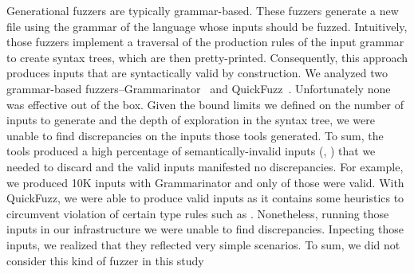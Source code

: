 \documentclass[10pt,conference,anonymous]{IEEEtran}
\begin{document}
Generational fuzzers are typically grammar-based. These fuzzers
generate a new file using the grammar of the language whose inputs
should be fuzzed. Intuitively, those fuzzers implement a traversal of
the production rules of the input grammar to create syntax trees,
which are then pretty-printed. Consequently, this approach produces
inputs that are syntactically valid by construction.  We analyzed two
grammar-based fuzzers--Grammarinator~\cite{grammarinator} and
QuickFuzz~\cite{quickfuzz,grieco2016quickfuzz}.  Unfortunately none
was effective out of the box. Given the bound limits we defined on the
number of inputs to generate and the depth of exploration in the
syntax tree, we were unable to find discrepancies on the inputs those
tools generated. To sum, the tools produced a high percentage of
semantically-invalid inputs (\eg{}, ) that we needed to
discard and the valid inputs manifested no discrepancies. For example,
we produced 10K inputs with Grammarinator and only  of those
were valid. With QuickFuzz, we were able to produce 
valid inputs as it contains some heuristics to circumvent violation of
certain type rules such as . Nonetheless, running those inputs in our infrastructure
we were unable to find discrepancies. Inpecting those inputs, we
realized that they reflected very simple scenarios.  To sum, we did not consider this kind of fuzzer in this
study


\end{document}

